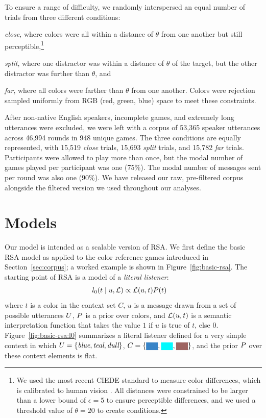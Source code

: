 \documentclass[11pt,letterpaper]{article}
\newcommand{\term}{\textit}
\newcommand{\word}{\textit}
\newcommand{\utt}{u}
\newcommand{\context}{C}
\newcommand{\target}{t}
\renewcommand{\|}{\mid}
\newcommand{\set}[1]{\left\{#1\right\}}
\newcommand{\secref}[1]{Section~\ref{#1}}
\newcommand{\Figref}[1]{Figure~\ref{#1}}
\newcommand{\figref}[1]{Figure~\ref{#1}}
\newcommand{\colorPatch}[2][xxxx]{
  \colorbox[HTML]{#2}{{\color[HTML]{#2}#1}}}
\newcommand{\colorContextNarrow}[3]{
  \colorPatch[xx]{#1}, \colorPatch[xx]{#2}, \colorPatch[xx]{#3}}
\newcommand{\cond}{\emph}
\begin{document}
To ensure a range of difficulty, we randomly interspersed an equal
number of trials from three different conditions:
%
\begin{enumerate*}[label=(\arabic*)]%
\item \cond{close}, where colors were all within a distance of
  $\theta$ from one another but still perceptible,\footnote{We used the
    most recent CIEDE standard to measure color differences, which is
    calibrated to human vision \cite{SharmaWuDalal05_DeltaE}. All
    distances were constrained to be larger than a lower bound of
    $\epsilon = 5$ to ensure perceptible differences, and we used a
    threshold value of $\theta = 20$ to create conditions.} 
\item \cond{split}, where one distractor was within a distance of
  $\theta$ of the target, but the other distractor was further than
  $\theta$, and
\item \cond{far}, where all colors were farther than $\theta$ from one
  another. Colors were rejection sampled uniformly from RGB (red,
  green, blue) space to meet these constraints.
\end{enumerate*}

After non-native English speakers, incomplete games, and extremely long utterances were excluded, we were left with a corpus of 53,365 speaker utterances across 46,994 rounds in 948 unique games. The three conditions are equally represented, with 15,519 \emph{close} trials, 15,693 \emph{split} trials, and 15,782 \emph{far} trials. Participants were allowed to play more than once, but the modal number of games played per participant was one (75\%). The modal number of messages sent per round was also one (90\%). We have released our raw, pre-filtered corpus alongside the filtered version we used throughout our analyses. 

\section{Models}

Our model is intended as a scalable version of RSA. We first define the
basic RSA model as applied to the
color reference games introduced in \secref{sec:corpus}; a worked example
is shown in \figref{fig:basic-rsa}. The starting point of RSA is a model
of a \term{literal listener}:
\begin{align}
  l_{0}(\target \| \utt, \Lex)
  &\propto
  \Lex(\utt, \target) \targetPrior(\target)
\end{align}
where $\target$ is a color in the context
set $\context$, $\utt$ is a message drawn from a set of possible
utterances $U$, $P$ is a prior over colors,
and $\Lex(\utt, \target)$ is a semantic interpretation function that
takes the value $1$ if $\utt$ is true of $\target$, else $0$.
\Figref{fig:basic-rsa:l0} summarizes a literal listener defined for 
a very simple context in which $\Messages=\set{\word{blue},
  \word{teal}, \word{dull}}$, $\context =
\set{\colorContextNarrow{3884C7}{02F9FD}{9E6461}{}}$, 
and the prior $P$ over these context elements is flat.
\end{document}
